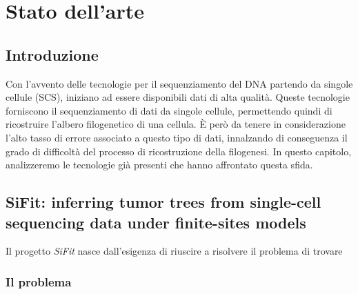 
\chapter{Stato dell'arte}
\label{chap:art}


\section{Introduzione}
\label{chap:art-intro}
Con l'avvento delle tecnologie per il sequenziamento del DNA partendo da singole cellule (SCS), iniziano ad essere disponibili dati di alta qualità. Queste tecnologie forniscono il sequenziamento di dati da singole cellule, permettendo quindi di ricostruire l'albero filogenetico di una cellula. È però da tenere in considerazione l'alto tasso di errore associato a questo tipo di dati, innalzando di conseguenza il grado di difficoltà del processo di ricostruzione della filogenesi. 
In questo capitolo, analizzeremo le tecnologie già presenti che hanno affrontato questa sfida. 


\section{SiFit: inferring tumor trees from single-cell sequencing data under finite-sites models}
\label{chap:art-sifit}
Il progetto \textit{SiFit} nasce dall'esigenza di riuscire a risolvere il problema di trovare 

\subsection{Il problema}
\label{chap:art-sifit-prob}